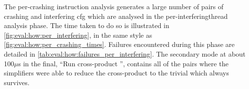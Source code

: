 The per-crashing instruction analysis generates a large number of
pairs of crashing {\StateMachine} and interfering \gls{cfg} which are
analysed in the per-\gls{interferingthread} analysis phase.  The time
taken to do so is illustrated in
\autoref{fig:eval:how:per_interfering}, in the same style as
\autoref{fig:eval:how:per_crashing_times}.  Failures encountered
during this phase are detailed in
\autoref{tab:eval:how:failures_per_interfering}.  The secondary mode
at about 100$\mu$s in the final, ``Run cross-product
{\StateMachine}'', contains all of the {\StateMachine} pairs where the
{\StateMachine} simplifiers were able to reduce the cross-product
{\StateMachine} to the trivial {\StateMachine} which always survives.

\begin{sanefig}
  \caption{Time taken by per-\gls{interferingthread} analysis steps,
    in seconds, as distributions over the 27535 interfering
    \glspl{cfg} generated by the per-crashing instruction phase.  In
    this figure, the {\StateMachine}-building steps include
    {\StateMachine} simplification.  The second step, ``Rederive
    crashing {\StateMachine}'', performs various additional
    simplifications to the crashing {\StateMachine} which become
    possible once {\technique} has identified the interfering
    {\StateMachine}.}
  \label{fig:eval:how:per_interfering}
\end{sanefig}

